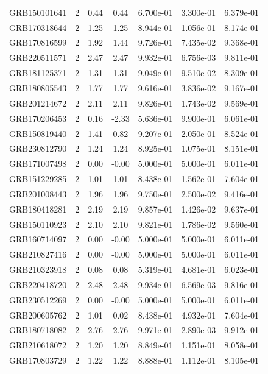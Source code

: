 \documentclass[12pt]{article}
\begin{document}
\begin{table}[h!]
{\begin{tabular}{l c c c c c c}
GRB150101641 & 2 & 0.44 & 0.44 & 6.700e-01 & 3.300e-01 & 6.379e-01 \\
GRB170318644 & 2 & 1.25 & 1.25 & 8.944e-01 & 1.056e-01 & 8.174e-01 \\
GRB170816599 & 2 & 1.92 & 1.44 & 9.726e-01 & 7.435e-02 & 9.368e-01 \\
GRB220511571 & 2 & 2.47 & 2.47 & 9.932e-01 & 6.756e-03 & 9.811e-01 \\
GRB181125371 & 2 & 1.31 & 1.31 & 9.049e-01 & 9.510e-02 & 8.309e-01 \\
GRB180805543 & 2 & 1.77 & 1.77 & 9.616e-01 & 3.836e-02 & 9.167e-01 \\
GRB201214672 & 2 & 2.11 & 2.11 & 9.826e-01 & 1.743e-02 & 9.569e-01 \\
GRB170206453 & 2 & 0.16 & -2.33 & 5.636e-01 & 9.900e-01 & 6.061e-01 \\
GRB150819440 & 2 & 1.41 & 0.82 & 9.207e-01 & 2.050e-01 & 8.524e-01 \\
GRB230812790 & 2 & 1.24 & 1.24 & 8.925e-01 & 1.075e-01 & 8.151e-01 \\
GRB171007498 & 2 & 0.00 & -0.00 & 5.000e-01 & 5.000e-01 & 6.011e-01 \\
GRB151229285 & 2 & 1.01 & 1.01 & 8.438e-01 & 1.562e-01 & 7.604e-01 \\
GRB201008443 & 2 & 1.96 & 1.96 & 9.750e-01 & 2.500e-02 & 9.416e-01 \\
GRB180418281 & 2 & 2.19 & 2.19 & 9.857e-01 & 1.426e-02 & 9.637e-01 \\
GRB150110923 & 2 & 2.10 & 2.10 & 9.821e-01 & 1.786e-02 & 9.560e-01 \\
GRB160714097 & 2 & 0.00 & -0.00 & 5.000e-01 & 5.000e-01 & 6.011e-01 \\
GRB210827416 & 2 & 0.00 & -0.00 & 5.000e-01 & 5.000e-01 & 6.011e-01 \\
GRB210323918 & 2 & 0.08 & 0.08 & 5.319e-01 & 4.681e-01 & 6.023e-01 \\
GRB220418720 & 2 & 2.48 & 2.48 & 9.934e-01 & 6.569e-03 & 9.816e-01 \\
GRB230512269 & 2 & 0.00 & -0.00 & 5.000e-01 & 5.000e-01 & 6.011e-01 \\
GRB200605762 & 2 & 1.01 & 0.02 & 8.438e-01 & 4.932e-01 & 7.604e-01 \\
GRB180718082 & 2 & 2.76 & 2.76 & 9.971e-01 & 2.890e-03 & 9.912e-01 \\
GRB210618072 & 2 & 1.20 & 1.20 & 8.849e-01 & 1.151e-01 & 8.058e-01 \\
GRB170803729 & 2 & 1.22 & 1.22 & 8.888e-01 & 1.112e-01 & 8.105e-01 \\

\end{tabular}}
\end{table}
\end{document}
